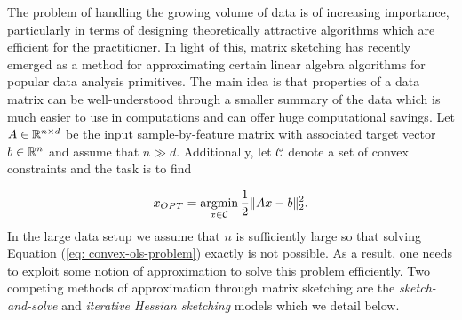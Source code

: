 
The problem of handling the growing volume of data is of increasing
importance, particularly in terms of designing theoretically attractive
algorithms
which are efficient for the practitioner.
In light of this, matrix sketching has recently emerged as a method for
 approximating certain
linear algebra algorithms for popular data analysis primitives.
The main idea is that properties of a data matrix can be well-understood
through a
smaller summary of the data which is much easier to use in computations and
can offer huge computational savings.
Let $A \in \mathbb{R}^{n \times d}$ be the input sample-by-feature matrix with
associated target vector $b \in \mathbb{R}^n$ and assume that $n \gg d$.
Additionally, let $\mathcal{C}$ denote a set of convex constraints and the
task is to find

\begin{equation} \label{eq: convex-ols-problem}
  x_{OPT} = \operatorname*{argmin}_{x \in \mathcal{C}} \frac{1}{2} \|Ax-b\|_2^2.
\end{equation}
\noindent In the large data setup we assume that $n$ is sufficiently large so
that solving Equation (\ref{eq: convex-ols-problem}) exactly is not possible.
As a result, one needs to exploit some notion of approximation to solve this
problem efficiently.
Two competing methods of approximation through matrix sketching are the
 \textit{sketch-and-solve} and \textit{iterative Hessian sketching} models which we
  detail below.



